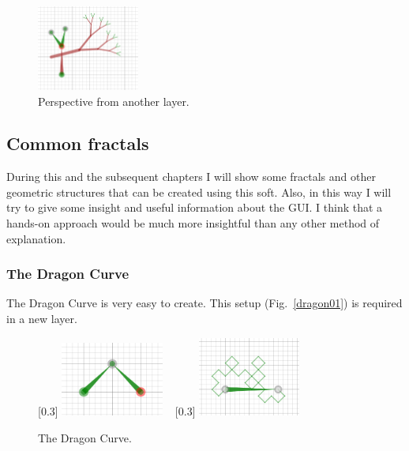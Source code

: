             \begin{figure}[ht]
                \caption{\label{baselayer04} Perspective from another layer.}
                \centering
                \includegraphics[width=0.3\textwidth]{img/baselayer04.png}
            \end{figure}

    \subsection{Common fractals}

        During this and the subsequent chapters I will show some fractals and other geometric structures that can be created using this soft.
        Also, in this way I will try to give some insight and useful information about the GUI.
        I think that a hands-on approach would be much more insightful than any other method of explanation.

        \subsubsection{The Dragon Curve}

            The Dragon Curve is very easy to create.
            This setup (Fig.~\ref{dragon01}) is required in a new layer.

            \begin{figure}[ht]
                \caption{The Dragon Curve.}
                \centering
                [0.3\textwidth]
                    {\includegraphics[width=0.3\textwidth]{img/dragon01.png}}
                ~
                [0.3\textwidth]
                    {\includegraphics[width=0.3\textwidth]{img/dragon02.png}}
            \end{figure}

